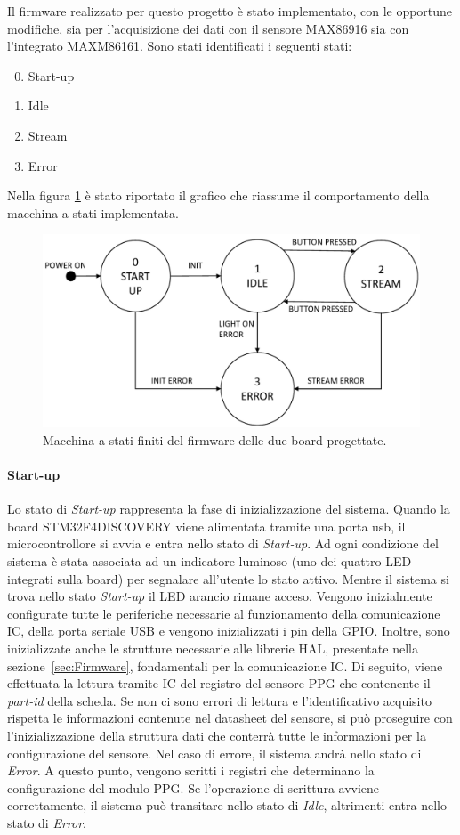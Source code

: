 Il firmware realizzato per questo progetto è stato implementato, con le opportune modifiche, sia per l'acquisizione dei dati con il sensore MAX86916 sia con l'integrato MAXM86161. Sono stati identificati i seguenti stati:
\begin{enumerate}
	\setcounter{enumi}{-1}
	\item Start-up
	\item Idle
	\item Stream
	\item Error
\end{enumerate}
Nella figura \ref{fig:FSM} è stato riportato il grafico che riassume il comportamento della macchina a stati implementata.
\begin{figure}[b]
	\centering
	\includegraphics[width=0.6\linewidth]{ImageFiles/Macchina a stati finiti/FSM}
	\caption{Macchina a stati finiti del firmware delle due board progettate.}
	\label{fig:FSM}
\end{figure}

\paragraph{Start-up}
Lo stato di \textit{Start-up} rappresenta la fase di inizializzazione del sistema. Quando la board STM32F4DISCOVERY viene alimentata tramite una porta usb, il microcontrollore si avvia e entra nello stato di \textit{Start-up}. Ad ogni condizione del sistema è stata associata ad un indicatore luminoso (uno dei quattro LED integrati sulla board) per segnalare all'utente lo stato attivo. Mentre il sistema si trova nello stato \textit{Start-up} il LED arancio rimane acceso. Vengono inizialmente configurate tutte le periferiche necessarie al funzionamento della comunicazione IC, della porta seriale USB e vengono inizializzati i pin della GPIO. Inoltre, sono inizializzate anche le strutture necessarie alle librerie HAL, presentate nella sezione~\ref{sec:Firmware}, fondamentali per la comunicazione IC. Di seguito, viene effettuata la lettura tramite IC del registro del sensore PPG che contenente il \textit{part-id} della scheda. Se non ci sono errori di lettura e l'identificativo acquisito rispetta le informazioni contenute nel datasheet del sensore, si può proseguire con l'inizializzazione della struttura dati che conterrà tutte le informazioni per la configurazione del sensore. Nel caso di errore, il sistema andrà nello stato di \textit{Error}. A questo punto, vengono scritti i registri che determinano la configurazione del modulo PPG. Se l'operazione di scrittura avviene correttamente, il sistema può transitare nello stato di \textit{Idle}, altrimenti entra nello stato di \textit{Error}.
